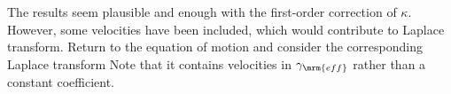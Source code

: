 The results seem plausible and enough with the first-order correction of $\kappa$. However, some velocities have been included, which would contribute to Laplace transform. Return to the equation of motion
and consider the corresponding Laplace transform
Note that it contains velocities in $\gamma_{\mrm{eff}}$ rather than a constant coefficient. %

